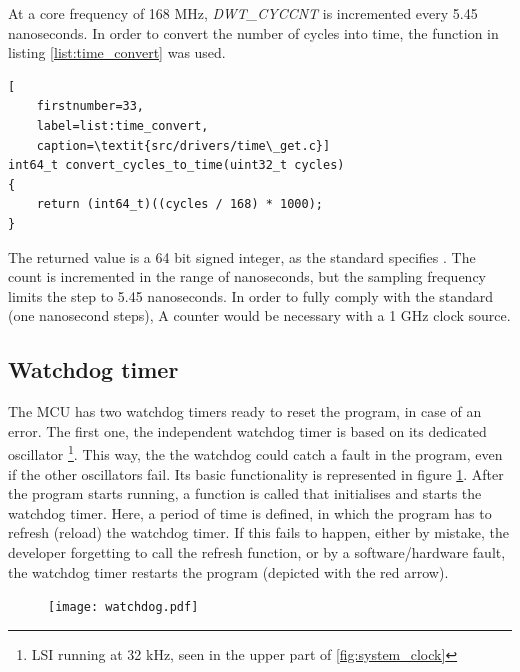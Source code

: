 At a core frequency of 168 MHz, \textit{DWT\_CYCCNT} is
incremented every 5.45 nanoseconds. In order to convert the number
of cycles into time, the function in listing \ref{list:time_convert}
was used.

\begin{minipage}{\linewidth}
\begin{lstlisting}[
	firstnumber=33,
	label=list:time_convert,
	caption=\textit{src/drivers/time\_get.c}]
int64_t convert_cycles_to_time(uint32_t cycles)
{
    return (int64_t)((cycles / 168) * 1000);
}
\end{lstlisting}
\end{minipage}

The returned value is a 64 bit signed integer, as the \arinc{} standard
specifies \cite{arinc_time}. The count is incremented in the range of nanoseconds,
but the sampling frequency limits the step to 5.45 nanoseconds.
In order to fully comply with the standard (one nanosecond steps),
A counter would be necessary with a 1 GHz clock source.


\subsection{Watchdog timer}
The MCU has two watchdog timers ready to reset the program, in case of an error.
The first one, the independent watchdog timer is based on its dedicated oscillator
\footnote{LSI running at 32 kHz, seen in the upper part of
 \ref{fig:system_clock}}.
This way, the the watchdog could catch a fault in the program, even if the other
oscillators fail. Its basic functionality is represented in figure
\ref{fig:watchdog}. After the program starts running, a function is called
that initialises and starts the watchdog timer. Here, a period of time is defined,
in which the program has to refresh (reload) the watchdog timer.
If this fails to happen, either by mistake, the developer forgetting to
call the refresh function, or by a software/hardware fault, the watchdog
timer restarts the program (depicted with the red arrow).

\begin{figure}[H]
\centering
\texttt{[image: watchdog.pdf]}
\label{fig:watchdog}
\end{figure}

